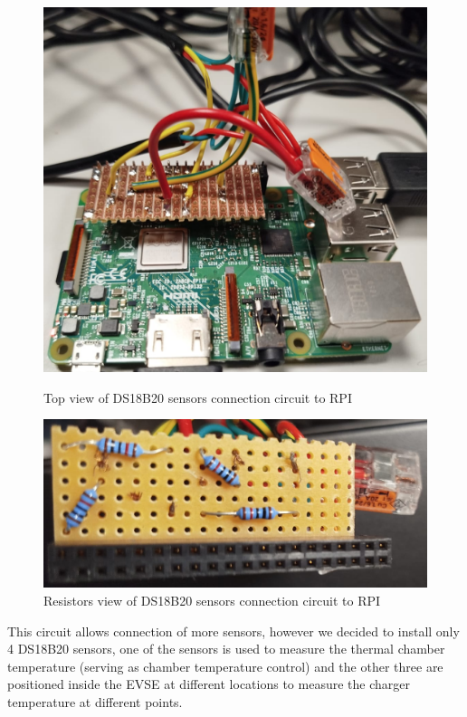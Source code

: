 \begin{figure}[H]
    \centering
    \begin{minipage}{0.48\textwidth}
        \centering
        \includegraphics[width=\linewidth]{figures/circuit_1.png}
        \caption{Top view of DS18B20 sensors connection circuit to RPI}
        \label{fig:circuit_1}
    \end{minipage}\hfill
    \begin{minipage}{0.48\textwidth}
        \centering
        \includegraphics[width=\linewidth]{figures/circuit_2.png}
        \caption{Resistors view of DS18B20 sensors connection circuit to RPI}
        \label{fig:circuit_2}
    \end{minipage}
\end{figure}

This circuit allows connection of more sensors, however we decided to install only 4 DS18B20 sensors, one of the sensors is used to measure the thermal chamber temperature (serving as chamber temperature control) and the other three are positioned inside the EVSE at different locations to measure the charger temperature at different points.


